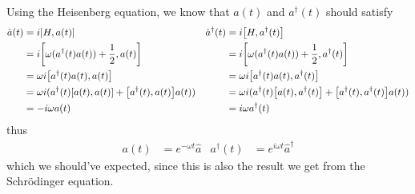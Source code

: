 \documentclass[notes.tex]{subfiles}
\begin{document}
Using the Heisenberg equation, we know that $a(t)$ and $a^\dagger(t)$ should satisfy
\begin{align*}
    \dot{a}(t) &= i\commutator{H}{a(t)} & \dot{a}^\dagger(t) &= i\commutator{H}{a^\dagger(t)}\\
    &= i\commutator{\omega(a^\dagger(t)a(t)) + \half{}}{a(t)} &&= i\commutator{\omega(a^\dagger(t)a(t)) + \half{}}{a^\dagger(t)}\\
    &= \omega i\commutator{a^\dagger(t)a(t)}{a(t)} &&= \omega i\commutator{a^\dagger(t)a(t)}{a^\dagger(t)}\\
    &= \omega i (a^\dagger(t) \commutator{a(t)}{a(t)} + \commutator{a^\dagger(t)}{a(t)}a(t))&&=\omega i (a^\dagger(t) \commutator{a(t)}{a^\dagger(t)} + \commutator{a^\dagger(t)}{a^\dagger(t)}a(t))\\
    &= -i\omega a(t) &&= i\omega a^\dagger(t)
\end{align*}
thus
\begin{align*}
    a(t) &= e^{-\omega t} \hat{a} & a^\dagger(t) &= e^{i\omega t} \hat{a}^\dagger
\end{align*}
which we should've expected, since this is also the result we get from the Schr\"odinger equation.
\end{document}
